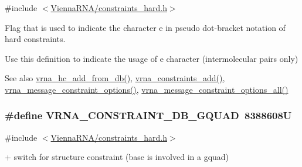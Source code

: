 {\ttfamily \#include $<$\hyperlink{constraints__hard_8h}{Vienna\+R\+N\+A/constraints\+\_\+hard.\+h}$>$}



Flag that is used to indicate the character \textquotesingle{}e\textquotesingle{} in pseudo dot-\/bracket notation of hard constraints. 

Use this definition to indicate the usage of \textquotesingle{}e\textquotesingle{} character (intermolecular pairs only)

\begin{DoxySeeAlso}{See also}
\hyperlink{group__hard__constraints_ga5b4de3247b67358080c176b94591a8e6}{vrna\+\_\+hc\+\_\+add\+\_\+from\+\_\+db()}, \hyperlink{group__constraints_ga35a401f680969a556858a8dd5f1d07cc}{vrna\+\_\+constraints\+\_\+add()}, \hyperlink{group__constraints_gaa1f20b53bf09ac2e6b0dbb13f7d89670}{vrna\+\_\+message\+\_\+constraint\+\_\+options()}, \hyperlink{group__constraints_gaec7e13fa0465c2acc7a621d1aecb709f}{vrna\+\_\+message\+\_\+constraint\+\_\+options\+\_\+all()} 
\end{DoxySeeAlso}
\subsubsection[{\texorpdfstring{V\+R\+N\+A\+\_\+\+C\+O\+N\+S\+T\+R\+A\+I\+N\+T\+\_\+\+D\+B\+\_\+\+G\+Q\+U\+AD}{VRNA_CONSTRAINT_DB_GQUAD}}]{\setlength{\rightskip}{0pt plus 5cm}\#define V\+R\+N\+A\+\_\+\+C\+O\+N\+S\+T\+R\+A\+I\+N\+T\+\_\+\+D\+B\+\_\+\+G\+Q\+U\+AD~8388608U}\hypertarget{group__hard__constraints_ga75cfab03cdc97c95b3ce8bb29f52b08e}{}\label{group__hard__constraints_ga75cfab03cdc97c95b3ce8bb29f52b08e}


{\ttfamily \#include $<$\hyperlink{constraints__hard_8h}{Vienna\+R\+N\+A/constraints\+\_\+hard.\+h}$>$}



\textquotesingle{}+\textquotesingle{} switch for structure constraint (base is involved in a gquad) 

